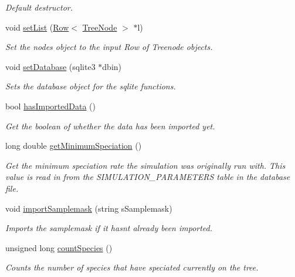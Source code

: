 \begin{DoxyCompactItemize}
\begin{DoxyCompactList}\small\item\em Default destructor. \end{DoxyCompactList}\item 
void \hyperlink{group___community_objects_a710a402dffa1b85183dd7f4a5a44f988}{set\+List} (\hyperlink{class_row}{Row}$<$ \hyperlink{class_tree_node}{Tree\+Node} $>$ $\ast$l)
\begin{DoxyCompactList}\small\item\em Set the nodes object to the input Row of Treenode objects. \end{DoxyCompactList}\item 
void \hyperlink{group___community_objects_a6fe2fdb93911f403dd879ca2847e4933}{set\+Database} (sqlite3 $\ast$dbin)
\begin{DoxyCompactList}\small\item\em Sets the database object for the sqlite functions. \end{DoxyCompactList}\item 
bool \hyperlink{group___community_objects_a045f762ca30c3a20e8ef5911a4982160}{has\+Imported\+Data} ()
\begin{DoxyCompactList}\small\item\em Get the boolean of whether the data has been imported yet. \end{DoxyCompactList}\item 
long double \hyperlink{group___community_objects_a4e5dea65183810c3b27441736eca825a}{get\+Minimum\+Speciation} ()
\begin{DoxyCompactList}\small\item\em Get the minimum speciation rate the simulation was originally run with. This value is read in from the S\+I\+M\+U\+L\+A\+T\+I\+O\+N\+\_\+\+P\+A\+R\+A\+M\+E\+T\+E\+RS table in the database file. \end{DoxyCompactList}\item 
void \hyperlink{group___community_objects_a01a137383e1e23f2191d63f16513a00a}{import\+Samplemask} (string s\+Samplemask)
\begin{DoxyCompactList}\small\item\em Imports the samplemask if it hasn\textquotesingle{}t already been imported. \end{DoxyCompactList}\item 
unsigned long \hyperlink{group___community_objects_a07970398c04e7c31ceda695c2860e20f}{count\+Species} ()
\begin{DoxyCompactList}\small\item\em Counts the number of species that have speciated currently on the tree. \end{DoxyCompactList}\item 

\end{DoxyCompactItemize}
